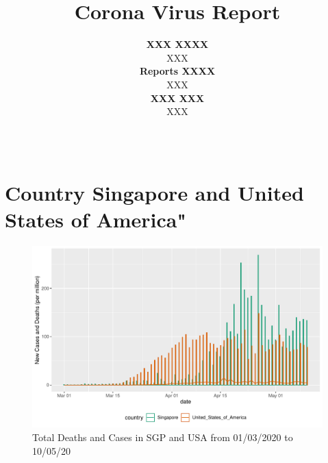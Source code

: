 \documentclass[11pt,a4paper,]{article}
\title{Corona Virus Report}
\author{\sf\Large\textbf{ XXX XXXX}\\ {\sf\large XXX\\[0.5cm]} \sf\Large\textbf{ Reports XXXX}\\ {\sf\large XXX\\[0.5cm]} \sf\Large\textbf{ XXX XXX}\\ {\sf\large XXX\\[0.5cm]}}
\date{\sf\Date~\Month~\Year}
\makeatletter
\def\titlepage{\front{\expandafter{\@title}}{\@author}{\@organization}}
\makeatother
\begin{document}
\titlepage

\section*{Country Singapore and United States of America"}

\begin{figure}
\centering
\includegraphics{report_files/figure-latex/sgp-usa-barchart-1.pdf}
\caption{\label{fig:sgp-usa-barchart}Total Deaths and Cases in SGP and USA from 01/03/2020 to 10/05/20}
\end{figure}
\end{document}
